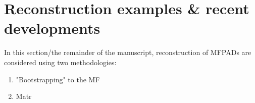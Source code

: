 \section{Reconstruction examples & recent developments}

In this section/the remainder of the manuscript, reconstruction of MFPADs are considered using two methodologies:

\begin{enumerate}
\item "Bootstrapping" to the MF
\item Matr
\end{enumerate}